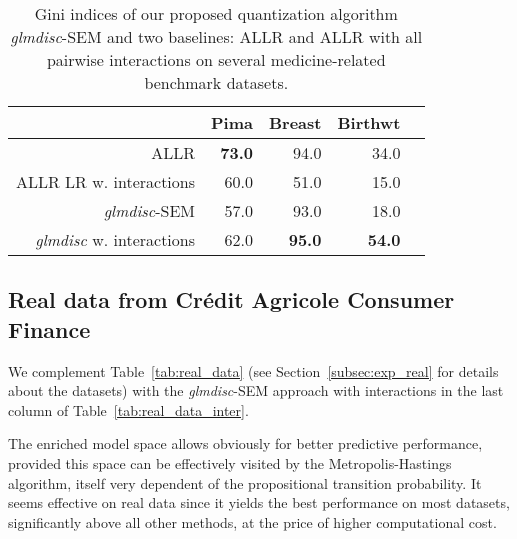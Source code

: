 \begin{table}[t]
\begin{center}
\caption{Gini indices of our proposed quantization algorithm \textit{glmdisc}-SEM and two baselines: ALLR and ALLR with all pairwise interactions on several medicine-related benchmark datasets.}
\label{tab:banchmark_medicine}
\begin{adjustbox}{max width=0.99\textwidth}
\begin{tabular}{rrrrr}
 & Pima & Breast & Birthwt \\ 
  \hline
ALLR & {\textbf{73.0}} & 94.0 & 34.0 \\ 
ALLR LR w. interactions & 60.0 & 51.0 & 15.0 \\ 
\textit{glmdisc}-SEM & 57.0 & 93.0 & 18.0 \\ 
\textit{glmdisc} w. interactions & 62.0 & {\textbf{95.0}} & {\textbf{54.0}} \\ 
\end{tabular}
\end{adjustbox}
\end{center}
\end{table}


\subsection{Real data from Crédit Agricole Consumer Finance}

We complement Table~\ref{tab:real_data} (see Section~\ref{subsec:exp_real} for details about the datasets) with the \textit{glmdisc}-SEM approach with interactions in the last column of Table~\ref{tab:real_data_inter}.

The enriched model space allows obviously for better predictive performance, provided this space can be effectively visited by the Metropolis-Hastings algorithm, itself very dependent of the propositional transition probability. It seems effective on real data since it yields the best performance on most datasets, significantly above all other methods, at the price of higher computational cost.

